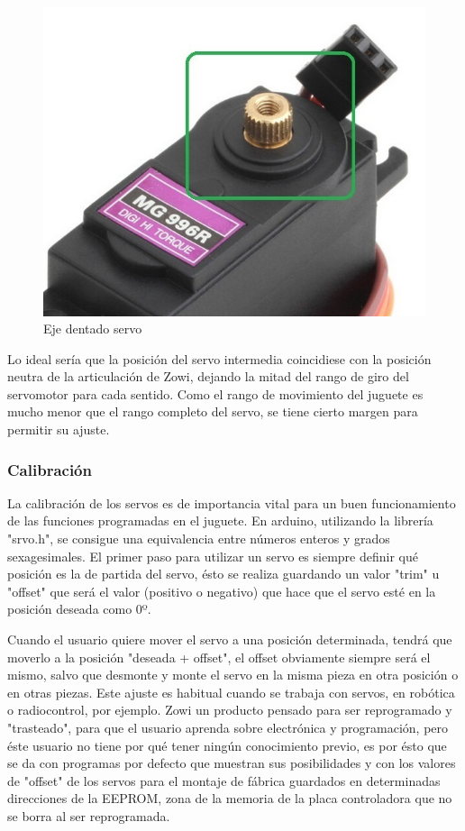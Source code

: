 \begin{figure}
\centering
\includegraphics[width=120mm]{Figures/servo-shft.jpg}
\caption[Eje dentado servo]{Eje dentado servo}
\label{fig:EjeServo}
\end{figure}

Lo ideal sería que la posición del servo intermedia coincidiese con la posición neutra de la articulación de Zowi, dejando la mitad del rango de giro del servomotor para cada sentido. Como el rango de movimiento del juguete es mucho menor que el rango completo del servo, se tiene cierto margen para permitir su ajuste.

\subsubsection{Calibración}
La calibración de los servos es de importancia vital para un buen funcionamiento de las funciones programadas en el juguete. En arduino, utilizando la librería "srvo.h", se consigue una equivalencia entre números enteros y grados sexagesimales. El primer paso para utilizar un servo es siempre definir qué posición es la de partida del servo, ésto se realiza guardando un valor "trim" u "offset" que será el valor (positivo o negativo) que hace que el servo esté en la posición deseada como 0º.

Cuando el usuario quiere mover el servo a una posición determinada, tendrá que moverlo a la posición "deseada + offset", el offset obviamente siempre será el mismo, salvo que desmonte y monte el servo en la misma pieza en otra posición o en otras piezas. Este ajuste es habitual cuando se trabaja con servos, en robótica o radiocontrol, por ejemplo. Zowi  un producto pensado para ser reprogramado y "trasteado", para que el usuario aprenda sobre electrónica y programación, pero éste usuario no tiene por qué tener ningún conocimiento previo, es por ésto que se da con programas por defecto que muestran sus posibilidades y con los valores de "offset" de los servos para el montaje de fábrica guardados en determinadas direcciones de la EEPROM, zona de la memoria de la placa controladora que no se borra al ser reprogramada.

